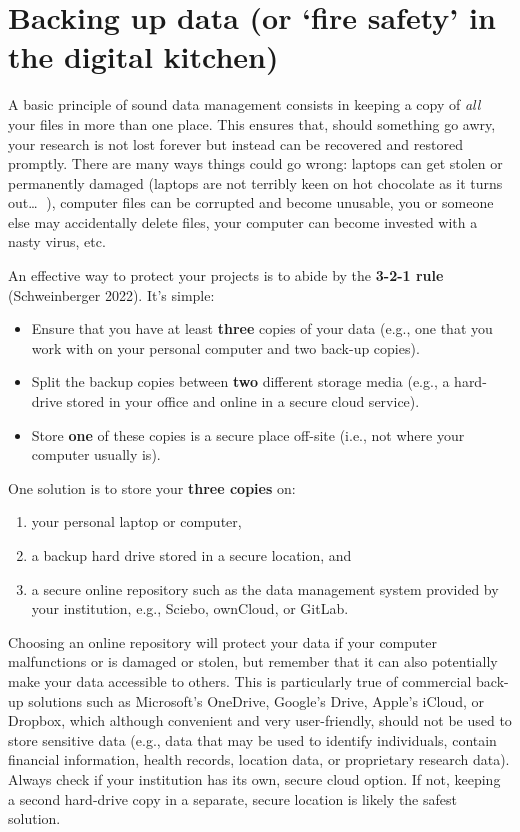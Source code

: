 \documentclass[
  letterpaper,
  DIV=11,
  numbers=noendperiod]{scrreprt}
\providecommand{\tightlist}{%
  \setlength{\itemsep}{0pt}\setlength{\parskip}{0pt}}\usepackage{longtable,booktabs,array}
\begin{document}
\section{Backing up data (or `fire safety' in the digital kitchen)
🧯}\label{backing-up-data-or-fire-safety-in-the-digital-kitchen}

A basic principle of sound data management consists in keeping a copy of
\emph{all} your files in more than one place. This ensures that, should
something go awry, your research is not lost forever but instead can be
recovered and restored promptly. There are many ways things could go
wrong: laptops can get stolen or permanently damaged (laptops are not
terribly keen on hot chocolate as it turns out\ldots{} 🙈), computer
files can be corrupted and become unusable, you or someone else may
accidentally delete files, your computer can become invested with a
nasty virus, etc.

An effective way to protect your projects is to abide by the
\textbf{3-2-1 rule} (Schweinberger 2022). It's simple:

\begin{itemize}
\tightlist
\item
  Ensure that you have at least \textbf{three} copies of your data
  (e.g., one that you work with on your personal computer and two
  back-up copies).
\item
  Split the backup copies between \textbf{two} different storage media
  (e.g., a hard-drive stored in your office and online in a secure cloud
  service).
\item
  Store \textbf{one} of these copies is a secure place off-site (i.e.,
  not where your computer usually is).
\end{itemize}

One solution is to store your \textbf{three copies} on:

\begin{enumerate}
\def\labelenumi{\arabic{enumi}.}
\tightlist
\item
  your personal laptop or computer,
\item
  a backup hard drive stored in a secure location, and
\item
  a secure online repository such as the data management system provided
  by your institution, e.g., Sciebo, ownCloud, or GitLab.
\end{enumerate}

Choosing an online repository will protect your data if your computer
malfunctions or is damaged or stolen, but remember that it can also
potentially make your data accessible to others. This is particularly
true of commercial back-up solutions such as Microsoft's OneDrive,
Google's Drive, Apple's iCloud, or Dropbox, which although convenient
and very user-friendly, should not be used to store sensitive data
(e.g., data that may be used to identify individuals, contain financial
information, health records, location data, or proprietary research
data). Always check if your institution has its own, secure cloud
option. If not, keeping a second hard-drive copy in a separate, secure
location is likely the safest solution.
\end{document}
